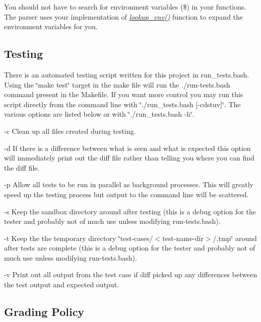 You should not have to search for environment variables (\$) in your functions. The parser uses your implementation of {\itshape \hyperlink{execute_8c_afeab372587374ba444aa9bdfb6cfa0d8}{lookup\+\_\+env()}} function to expand the environment variables for you.

\subsection*{Testing}

There is an automated testing script written for this project in run\+\_\+tests.\+bash. Using the \char`\"{}make test\char`\"{} target in the make file will run the ./run-\/tests.bash command present in the Makefile. If you want more control you may run this script directly from the command line with \char`\"{}./run\+\_\+tests.\+bash \mbox{[}-\/cdstuv\mbox{]}\char`\"{}. The various options are listed below or with \char`\"{}./run\+\_\+tests.\+bash -\/h\char`\"{}.


\begin{DoxyItemize}
\item -\/c Clean up all files created during testing.
\item -\/d If there is a difference between what is seen and what is expected this option will immediately print out the diff file rather than telling you where you can find the diff file.
\item -\/p Allow all tests to be run in parallel as background processes. This will greatly speed up the testing process but output to the command line will be scattered.
\item -\/s Keep the sandbox directory around after testing (this is a debug option for the tester and probably not of much use unless modifying run-\/tests.\+bash).
\item -\/t Keep the the temporary directory \char`\"{}test-\/cases/$<$test-\/name-\/dir$>$/.\+tmp\char`\"{} around after tests are complete (this is a debug option for the tester and probably not of much use unless modifying run-\/tests.\+bash).
\item -\/v Print out all output from the test case if diff picked up any differences between the test output and expected output.
\end{DoxyItemize}

\subsection*{Grading Policy}

